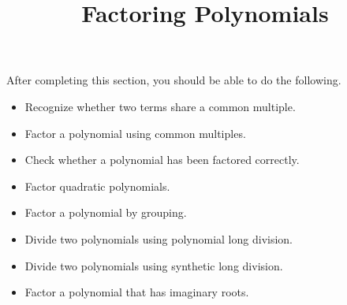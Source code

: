\documentclass{ximera}
\title{Factoring Polynomials}
\begin{document}
\begin{abstract} 
\end{abstract}

\maketitle

\begin{sectionOutcomes}
After completing this section, you should be able to do the following.

\begin{itemize}
	\item Recognize whether two terms share a common multiple. 
    \item Factor a polynomial using common multiples. 
    \item Check whether a polynomial has been factored correctly.
    \item Factor quadratic polynomials. 
    \item Factor a polynomial by grouping. 
    \item Divide two polynomials using polynomial long division.
    \item Divide two polynomials using synthetic long division.
    \item Factor a polynomial that has imaginary roots.


\end{itemize}
\end{sectionOutcomes}
\end{document}
